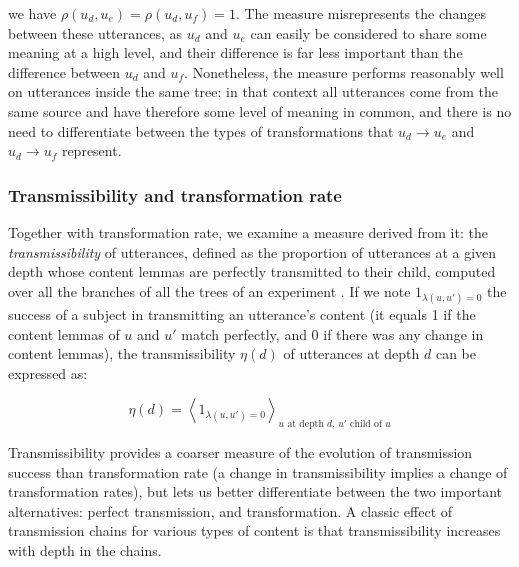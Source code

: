 we have \(\rho(u_d, u_e) = \rho(u_d, u_f) = 1\). The measure
misrepresents the changes between these utterances, as \(u_d\) and
\(u_e\) can easily be considered to share some meaning at a high level,
and their difference is far less important than the difference between
\(u_d\) and \(u_f\). Nonetheless, the measure performs reasonably well
on utterances inside the same tree: in that context all utterances come
from the same source and have therefore some level of meaning in common,
and there is no need to differentiate between the types of
transformations that \(u_d \rightarrow u_e\) and \(u_d \rightarrow u_f\)
represent.

\subsubsection{Transmissibility and transformation
rate}\label{transmissibility-and-transformation-rate}

Together with transformation rate, we examine a measure derived from it:
the \emph{transmissibility} of utterances, defined as the proportion of
utterances at a given depth whose content lemmas are perfectly
transmitted to their child, computed over all the branches of all the
trees of an experiment \autocite[this measure was introduced as
\enquote{average success} in][]{claidiere_cultural_2014}. If we note
\(1_{\lambda(u, u') = 0}\) the success of a subject in
transmitting an utterance's content (it equals 1 if the content lemmas
of \(u\) and \(u'\) match perfectly, and 0 if there was any change in
content lemmas), the transmissibility \(\eta(d)\) of utterances at depth
\(d\) can be expressed as:

\[\eta(d) = \left< 1_{\lambda(u, u') = 0} \right>_{\text{$u$ at depth $d$, $u'$ child of $u$}}\]

Transmissibility provides a coarser measure of the evolution of
transmission success than transformation rate (a change in
transmissibility implies a change of transformation rates), but lets us
better differentiate between the two important alternatives: perfect
transmission, and transformation. A classic effect of transmission
chains for various types of content is that transmissibility increases
with depth in the chains.

